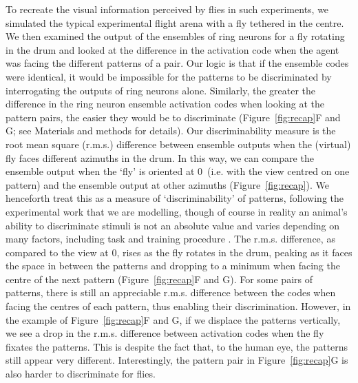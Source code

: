 To recreate the visual information perceived by flies in such experiments, we simulated the typical experimental flight arena with a fly tethered in the centre. We then examined the output of the ensembles of ring neurons for a fly rotating in the drum and looked at the difference in the activation code when the agent was facing the different patterns of a pair. Our logic is that if the ensemble codes were identical, it would be impossible for the patterns to be discriminated by interrogating the outputs of ring neurons alone. Similarly, the greater the difference in the ring neuron ensemble activation codes when looking at the pattern pairs, the easier they would be to discriminate (Figure~\ref{fig:recap}F and G; see Materials and methods for details). Our discriminability measure is the root mean square (r.m.s.) difference between ensemble outputs when the (virtual) fly faces different azimuths in the drum. In this way, we can compare the ensemble output when the `fly' is oriented at 0\degree\ (i.e. with the view centred on one pattern) and the ensemble output at other azimuths (Figure~\ref{fig:recap}). We henceforth treat this as a measure of `discriminability' of patterns, following the experimental work that we are modelling, though of course in reality an animal's ability to discriminate stimuli is not an absolute value and varies depending on many factors, including task and training procedure \cite{Dyer2004}. The r.m.s. difference, as compared to the view at 0\degree, rises as the fly rotates in the drum, peaking as it faces the space in between the patterns and dropping to a minimum when facing the centre of the next pattern (Figure~\ref{fig:recap}F and G). For some pairs of patterns, there is still an appreciable r.m.s. difference between the codes when facing the centres of each pattern, thus enabling their discrimination. However, in the example of Figure~\ref{fig:recap}F and G, if we displace the patterns vertically, we see a drop in the r.m.s. difference between activation codes when the fly fixates the patterns. This is despite the fact that, to the human eye, the patterns still appear very different. Interestingly, the pattern pair in Figure~\ref{fig:recap}G is also harder to discriminate for flies.

